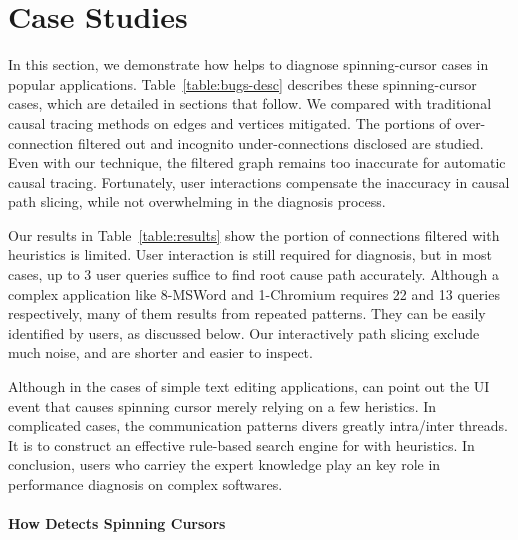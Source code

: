 \section{Case Studies}\label{sec:casestudy}

In this section, we demonstrate how \xxx helps to diagnose \nbug spinning-cursor
cases in popular applications. Table~\ref{table:bugs-desc} describes these
spinning-cursor cases, which are detailed in sections that follow. We compared
\xxx with traditional causal tracing methods on edges and vertices mitigated.
The portions of over-connection filtered out and incognito under-connections
disclosed are studied. Even with our technique, the filtered graph remains
too inaccurate for automatic causal tracing. Fortunately, user interactions
compensate the inaccuracy in causal path slicing, while not overwhelming in the
diagnosis process.

Our results in Table~\ref{table:results} show the portion of connections
filtered with heuristics is limited. User interaction is still required for
diagnosis, but in most cases, up to 3 user queries suffice to find root cause
path accurately. Although a complex application like 8-MSWord and 1-Chromium
requires 22 and 13 queries respectively, many of them results from repeated
patterns. They can be easily identified by users, as discussed below. Our
interactively path slicing exclude much noise, and are shorter and easier to
inspect.

Although in the cases of simple text editing applications, \xxx can point out
the UI event that causes spinning cursor merely relying on a few heristics.
In complicated cases, the communication patterns divers greatly intra/inter
threads. It is to construct an effective rule-based search engine for \xxx with
heuristics. In conclusion, users who carriey the expert knowledge play an key
role in performance diagnosis on complex softwares.

\paragraph{How \xxx Detects Spinning Cursors}

